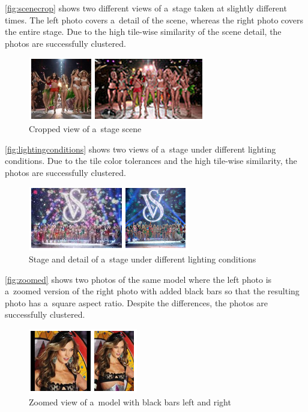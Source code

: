 \autoref{fig:scenecrop} shows two different views of a~stage
taken at slightly different times.
The left photo covers a~detail of the scene,
whereas the right photo covers the entire stage.
Due to the high tile-wise similarity of the scene detail,
the photos are successfully clustered.

\begin{figure}[!ht]
  \centering
  \includegraphics[width=0.5\linewidth]{./scene.png}
  \caption{Cropped view of a~stage scene}
  \label{fig:scenecrop}
\end{figure}

\autoref{fig:lightingconditions} shows two views of a~stage
under different lighting conditions.
Due to the tile color tolerances and the high tile-wise similarity,
the photos are successfully clustered.

\begin{figure}[!ht]
  \centering
  \includegraphics[width=0.5\linewidth]{./viewing_angle.png}
  \caption{Stage and detail of a~stage under different lighting conditions}
  \label{fig:lightingconditions}
\end{figure}

\autoref{fig:zoomed} shows two photos of the same model
where the left photo is a~zoomed version of the right photo 
with added black bars so that the resulting photo
has a~square aspect ratio.
Despite the differences, the photos are successfully clustered.

\begin{figure}[!ht]
  \centering
  \includegraphics[width=0.35\linewidth]{./zoom.png}
  \caption{Zoomed view of a~model with black bars left and right}
  \label{fig:zoomed}
\end{figure}

